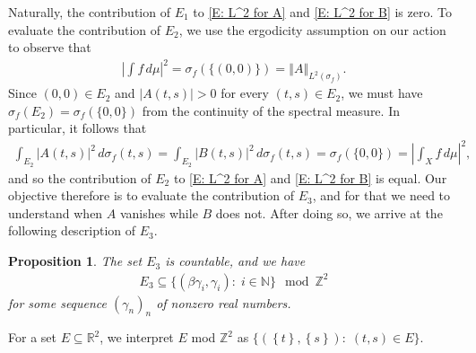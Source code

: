 \documentclass[11pt]{amsart}
\newtheorem{proposition}[lemma]{Proposition}
\theoremstyle{definition}
\DeclareMathOperator*{\E}{\mathbb{E}}
\newcommand{\N}{{\mathbb N}}
\newcommand{\R}{{\mathbb R}}
\newcommand{\Z}{{\mathbb Z}}
\newcommand{\norm}[1]{\left\Vert #1\right\Vert}
\newcommand{\1}{{\mathbf{1}}}
\newcommand{\abs}[1]{\mathopen{}\left| #1\mathclose{}\right|}
\newcommand{\brac}[1]{\mathopen{}\left( #1 \mathclose{}\right)}
\newcommand{\floor}[1]{{\left \lfloor #1 \right \rfloor}}
\newcommand{\rem}[1]{\left \{ #1 \right \}}
\begin{document}
Naturally, the contribution of $E_1$ to \eqref{E: L^2 for A} and \eqref{E: L^2 for B} is zero. To evaluate the contribution of $E_2$, we use the ergodicity assumption on our action to observe that 
\begin{align*}
    \abs{\int f\, d\mu}^2 = \sigma_f(\{(0,0)\})
    = \norm{A}_{L^2(\sigma_f)}.
\end{align*}
Since $(0,0)\in E_2$ and $|A(t,s)|>0$ for every $(t,s)\in E_2$, we must have $\sigma_f(E_2) = \sigma_f(\{0,0\})$ from the continuity of the spectral measure. In particular, it follows that 
\begin{align*}
    \int_{E_2}|A(t,s)|^2\, d\sigma_f(t,s) = \int_{E_2}|B(t,s)|^2\, d\sigma_f(t,s) = \sigma_f(\{0,0\}) = \abs{\int_X f\, d\mu}^2,
\end{align*}
and so the contribution of $E_2$ to \eqref{E: L^2 for A} and \eqref{E: L^2 for B} is equal. Our objective therefore is to evaluate the contribution of $E_3$, and for that we need to understand when $A$ vanishes while $B$ does not. 
After doing so, we arrive at the following description of $E_3$.
\begin{proposition}\label{P: E_3}
The set $E_3$ is countable, and we have
\begin{align*}
E_3 \subseteq \{\brac{\beta \gamma_i, \gamma_i}:\; i\in\N\} \mod\Z^2
\end{align*}
for some sequence $(\gamma_n)_n$ of nonzero real numbers. %
\end{proposition}
For a set $E\subseteq\R^2$, we interpret $E$ mod $\Z^2$ as $\{(\rem{t}, \rem{s}):\; (t,s)\in E\}$.
\end{document}
